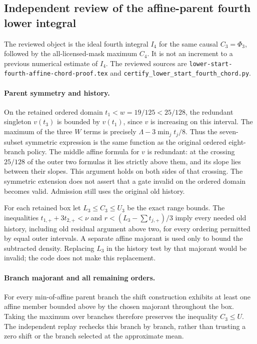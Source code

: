 \subsection{Independent review of the affine-parent fourth lower integral}
\label{sec:independent-fourth-chord-review}

The reviewed object is the ideal fourth integral $I_4$ for the same
causal $C_3=\Phi_3$, followed by the all-licensed-mask maximum $C_4$.
It is not an increment to a previous numerical estimate of $I_4$.
The reviewed sources are \texttt{lower-start-fourth-affine-chord-proof.tex}
and \texttt{certify\_lower\_start\_fourth\_chord.py}.

\paragraph{Parent symmetry and history.}
On the retained ordered domain $t_1<w=19/125<25/128$, the redundant
singleton $v(t_3)$ is bounded by $v(t_1)$, since $v$ is increasing
on this interval. The maximum of the three $W$ terms is precisely
$\Lambda-3\min_jt_j/8$. Thus the seven-subset symmetric expression
is the same function as the original ordered eight-branch policy.
The middle affine formula for $v$ is redundant: at the crossing
$25/128$ of the outer two formulas it lies strictly above them,
and its slope lies between their slopes. This argument holds on
both sides of that crossing. The symmetric extension does not
assert that a gate invalid on the ordered domain becomes valid.
Admission still uses the original old history.

For each retained box let $L_3\le C_3\le U_3$ be the exact range
bounds. The inequalities $t_{1,+}+3t_{2,+}<\nu$ and
$r<(L_3-\sum t_{j,+})/3$ imply every needed old history,
including old residual argument above two, for every ordering
permitted by equal outer intervals. A separate affine majorant is
used only to bound the subtracted density. Replacing $L_3$ in the
history test by that majorant would be invalid; the code does not
make this replacement.

\paragraph{Branch majorant and all remaining orders.}
For every min-of-affine parent branch the shift construction
exhibits at least one affine member bounded above by the chosen
majorant throughout the box. Taking the maximum over branches
therefore preserves the inequality $C_3\le U$. The independent
replay rechecks this branch by branch, rather than trusting a
zero shift or the branch selected at the approximate mean.


